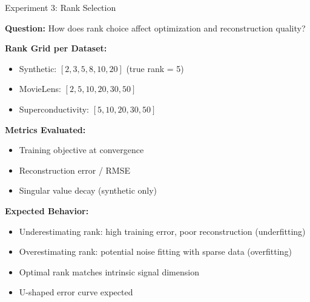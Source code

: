 \documentclass[aspectratio=169,usenames,dvipsnames]{beamer}
\begin{document}
\begin{frame}{Experiment 3: Rank Selection}

\textbf{Question:} How does rank choice affect optimization and reconstruction quality?

\vspace{0.3cm}

\textbf{Rank Grid per Dataset:}
\begin{itemize}
  \item Synthetic: $[2, 3, 5, 8, 10, 20]$ (true rank = 5)
  \item MovieLens: $[2, 5, 10, 20, 30, 50]$
  \item Superconductivity: $[5, 10, 20, 30, 50]$
\end{itemize}

\vspace{0.3cm}

\textbf{Metrics Evaluated:}
\begin{itemize}
  \item Training objective at convergence
  \item Reconstruction error / RMSE
  \item Singular value decay (synthetic only)
\end{itemize}

\vspace{0.3cm}

\textbf{Expected Behavior:}
\begin{itemize}
  \item Underestimating rank: high training error, poor reconstruction (underfitting)
  \item Overestimating rank: potential noise fitting with sparse data (overfitting)
  \item Optimal rank matches intrinsic signal dimension
  \item U-shaped error curve expected
\end{itemize}

\end{frame}
\end{document}

